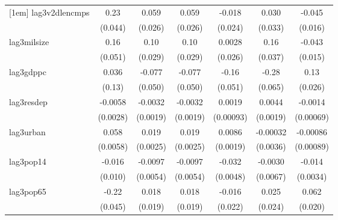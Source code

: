 \begin{table}[htbp]
\begin{tabular}{l*{6}{c}}
[1em]
lag3v2dlencmps&        0.23\sym{***}&       0.059\sym{*}  &       0.059\sym{*}  &      -0.018         &       0.030         &      -0.045\sym{**} \\
            &     (0.044)         &     (0.026)         &     (0.026)         &     (0.024)         &     (0.033)         &     (0.016)         \\
[1em]
lag3milsize &        0.16\sym{**} &        0.10\sym{***}&        0.10\sym{***}&      0.0028         &        0.16\sym{***}&      -0.043\sym{**} \\
            &     (0.051)         &     (0.029)         &     (0.029)         &     (0.026)         &     (0.037)         &     (0.015)         \\
[1em]
lag3gdppc   &       0.036         &      -0.077         &      -0.077         &       -0.16\sym{**} &       -0.28\sym{***}&        0.13\sym{***}\\
            &      (0.13)         &     (0.050)         &     (0.050)         &     (0.051)         &     (0.065)         &     (0.026)         \\
[1em]
lag3resdep  &     -0.0058\sym{*}  &     -0.0032         &     -0.0032         &      0.0019\sym{*}  &      0.0044\sym{*}  &     -0.0014\sym{*}  \\
            &    (0.0028)         &    (0.0019)         &    (0.0019)         &   (0.00093)         &    (0.0019)         &   (0.00069)         \\
[1em]
lag3urban   &       0.058\sym{***}&       0.019\sym{***}&       0.019\sym{***}&      0.0086\sym{***}&    -0.00032         &    -0.00086         \\
            &    (0.0058)         &    (0.0025)         &    (0.0025)         &    (0.0019)         &    (0.0036)         &   (0.00089)         \\
[1em]
lag3pop14   &      -0.016         &     -0.0097         &     -0.0097         &      -0.032\sym{***}&     -0.0030         &      -0.014\sym{***}\\
            &     (0.010)         &    (0.0054)         &    (0.0054)         &    (0.0048)         &    (0.0067)         &    (0.0034)         \\
[1em]
lag3pop65   &       -0.22\sym{***}&       0.018         &       0.018         &      -0.016         &       0.025         &       0.062\sym{**} \\
            &     (0.045)         &     (0.019)         &     (0.019)         &     (0.022)         &     (0.024)         &     (0.020)         \\

\end{tabular}
\end{table}

